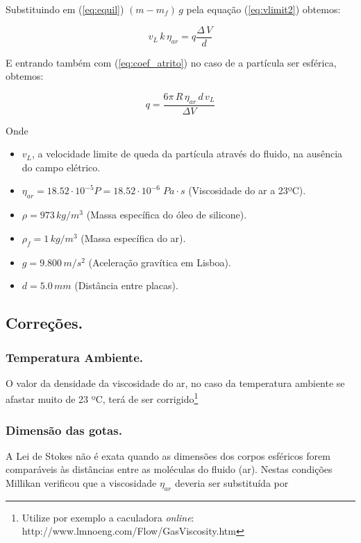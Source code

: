 \documentclass[a4paper,twoside,12pt]{article}      %
\begin{document}
\begin{multicols}{2}
Substituindo em (\ref{eq:equil}) $(m - m_f)\,g$   pela equação (\ref{eq:vlimit2}) obtemos:

\begin{equation*}
	v_L\, k\, \eta_{ar} = q \frac{\Delta\, V}{d}
\end{equation*}

E entrando também com (\ref{eq:coef_atrito}) no caso de a partícula ser esférica, obtemos:

\begin{equation}
	\label{eq:carga}
	q = \frac{6 \pi \, R \, \eta_{ar} \, d\, v_L}{\Delta V}  
\end{equation}

Onde

\begin{itemize}
\item $v_L$, a velocidade limite de queda da partícula através do fluido, na ausência do campo elétrico. 
\item $\eta_{ar} = 18.52 \cdot 10^{-5} P =  18.52 \cdot 10^{-6} \; Pa\cdot s $ (Viscosidade do ar a 23ºC).
\item $\rho = 973 \, kg/m^{3}$ (Massa específica do óleo de silicone).
\item $\rho_f = 1 \, kg/m^{3}$ (Massa específica do ar).
\item $g=9.800\, m/s^{2}$ (Aceleração gravítica em Lisboa).
\item $d=5.0\, mm$ (Distância entre placas).
\end{itemize}

\subsection{\sf Correções.}
\subsubsection{\sf Temperatura Ambiente.}

O valor da densidade da viscosidade do ar, no caso da temperatura ambiente se afastar muito de 23 ºC, terá de ser corrigido\footnote{Utilize por exemplo a caculadora \emph{online}: http://www.lmnoeng.com/Flow/GasViscosity.htm}

\subsubsection{\sf Dimensão das gotas.}

A Lei de Stokes não é exata quando as dimensões dos corpos esféricos forem comparáveis às distâncias entre as moléculas do fluido (ar).
Nestas condições Millikan verificou que a viscosidade $\eta_{ar}$ deveria ser substituída por


\end{multicols}
\end{document}
